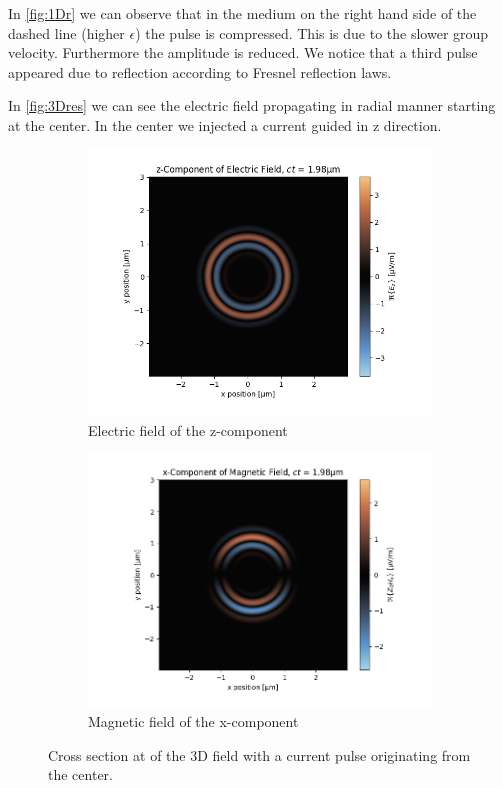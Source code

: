 \documentclass[a4paper,12pt]{scrartcl}
\begin{document}
    In \autoref{fig:1Dr} we can observe that in the medium on the right hand side of the dashed line (higher $\epsilon$) the pulse is
    compressed. This is due to the slower group velocity. Furthermore the amplitude is reduced. We notice that a third pulse appeared due to reflection according to Fresnel reflection laws.
    
    In \autoref{fig:3Dres} we can see the electric field propagating
    in radial manner starting at the center. In the center we injected a current guided in z direction. 
    \begin{figure}[H]
        \begin{subfigure}{.5\textwidth}
            \centering
            \includegraphics[width=\textwidth]{figures/3D-Ez.png}
            \caption{Electric field of the z-component}
            \label{fig:3Dl}
        \end{subfigure}
        \begin{subfigure}{.5\textwidth}
            \centering
            \includegraphics[width=\textwidth]{figures/3D-Hx.png}
            \caption{Magnetic field of the x-component}
            \label{fig:3Dr}
        \end{subfigure}
        \caption{Cross section at of the 3D field with a current pulse originating from the center.}
        \label{fig:3Dres}
    \end{figure}
\end{document}
